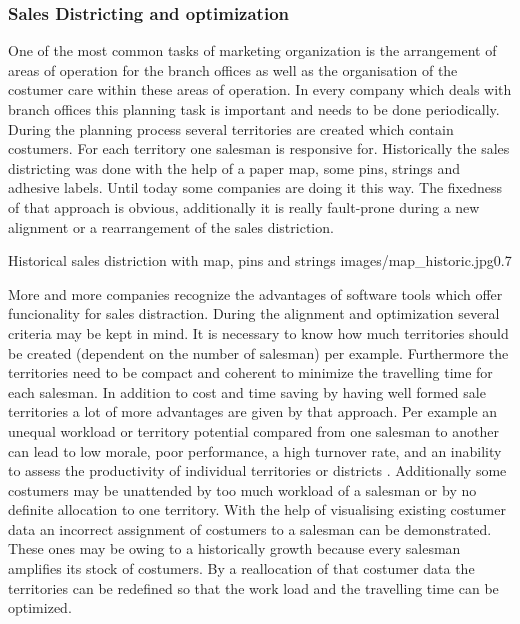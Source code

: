 \subsubsection{Sales Districting and optimization}
One of the most common tasks of marketing organization is the arrangement of areas of operation for the branch offices as well as the organisation of the costumer care within these areas of operation. In every company which deals with branch offices this planning task is important and needs to be done periodically. During the planning process several territories are created which contain costumers. For each territory one salesman is responsive for. Historically the sales districting was done with the help of a paper map, some pins, strings and adhesive labels. Until today some companies are doing it this way. The fixedness of that approach is obvious, additionally it is really fault-prone during a new alignment or a rearrangement of the sales distriction.

\begin{figurevarSize}{Historical sales distriction with map, pins and strings \cite{tappert}}{images/map_historic.jpg}{0.7}\end{figurevarSize} 

More and more companies recognize the advantages of software tools which offer funcionality for sales distraction. During the alignment and optimization several criteria may be kept in mind. It is necessary to know how much territories should be created (dependent on the number of salesman) per example. Furthermore the territories need to be compact and coherent to minimize the travelling time for each salesman.  In addition to cost and time saving by having well formed sale territories a lot of more advantages are given by that approach. Per example an unequal workload or territory potential compared from one salesman to another can lead to low morale, poor performance, a high turnover rate, and an inability to assess the productivity of individual territories or districts \cite{hessstuart}. Additionally some costumers may be unattended by too much workload of a salesman or by no definite allocation to one territory. With the help of visualising existing costumer data an incorrect assignment of costumers to a salesman can be demonstrated. These ones may be owing to a historically growth because every salesman amplifies its stock of costumers. By a reallocation of that costumer data the territories can be redefined so that the work load and the travelling time can be optimized.

